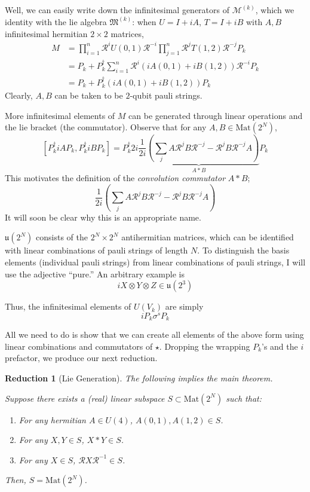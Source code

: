 \documentclass[fleqn,12pt]{article}
\newtheorem{reduction}{Reduction}
\begin{document}
Well, we can easily write down the infinitesimal generators
of $\mathcal{M}^{(k)}$, which we identity with the lie algebra
$\mathfrak{M}^{(k)}$:
when $U = I + iA$, $T = I + iB$ with $A,B$ infinitesimal
hermitian $2\times 2$ matrices,
\begin{align*}
    M & = \prod_{i = 1}^n \mathcal{R}^i U(0,1) \mathcal{R}^{-i} \prod_{j = 1}^n \mathcal{R}^j T(1,2) \mathcal{R}^{-j} P_k \\
      & = P_k + P^\dagger_k\sum_{i = 1}^n \mathcal{R}^i\left(iA(0,1) + iB(1,2)\right) \mathcal{R}^{-i} P_k                \\
      & = P_k + P^\dagger_k\left(iA(0,1) + iB(1,2)\right) P_k \tag{$\star$}
\end{align*}
Clearly, $A,B$ can be taken to be $2$-qubit pauli strings.

More infinitesimal elements of $M$ can be generated through
linear operations and the lie bracket (the commutator).
Observe that for any $A,B\in \text{Mat}(2^N)$,
\[
    [P^\dagger_k iA P_k, P^\dagger_k iB P_k]
    = P^\dagger_k 2i\underbrace{\frac{1}{2i}\left(\sum_j A \mathcal{R}^j B \mathcal{R}^{-j}
        - \mathcal{R}^j B\mathcal{R}^{-j}  A\right)}_{A * B} P_k
\]
This motivates the definition of the \emph{convolution commutator} $A * B$;
\[
    \frac{1}{2i}\left(\sum_j A \mathcal{R}^j B \mathcal{R}^{-j}
    - \mathcal{R}^j B\mathcal{R}^{-j}  A\right)
\]
It will soon be clear why this is an appropriate name.

$\mathfrak{u}(2^N)$ consists of the $2^N\times 2^N$ antihermitian matrices,
which can be identified with linear combinations of
pauli strings of length $N$. To distinguish the basis elements
(individual pauli strings)
from linear combinations of pauli strings, I will use the adjective ``pure.''
An arbitrary example is
\[
    iX\otimes Y\otimes Z \in \mathfrak{u}(2^3)
\]

Thus, the infinitesimal elements of $U(V_k)$ are simply
\[
    i P_k \sigma^s P_k
\]

All we need to do is show that we can create all elements of the above form using
linear combinations and commutators of $\star$.
Dropping the wrapping $P_k$'s and the $i$ prefactor,
we produce our next reduction.
\begin{reduction}
    [Lie Generation]
    \label{reduction:lie-generation}
    The following implies the main theorem.

    Suppose there exists a (real) linear subspace $S\subset \text{Mat}(2^N)$ such that:
    \begin{enumerate}
        \item For any hermitian $A\in U(4)$, $A(0,1), A(1,2) \in S$.
        \item For any $X, Y \in S$, $X * Y \in S$.
        \item For any $X \in S$, $\mathcal{R} X \mathcal{R}^{-1} \in S$.
    \end{enumerate}
    Then, $S = \text{Mat}(2^N)$.
\end{reduction}
\end{document}
